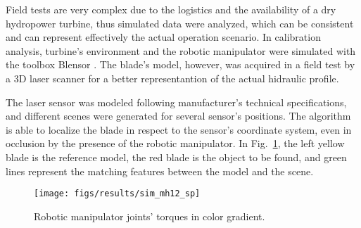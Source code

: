 Field tests are very complex due to the logistics and the availability of a dry
hydropower turbine, thus simulated data were analyzed, which can be consistent
and can represent effectively the actual operation scenario. In calibration
analysis, turbine's environment and the robotic manipulator were simulated with
the toolbox Blensor \cite{Gschwandtner11b}. The blade's model, however, was
acquired in a field test by a 3D laser scanner for a better representantion of
the actual hidraulic profile.

The laser sensor was modeled following manufacturer's technical
specifications, and different scenes were generated for several sensor's
positions. The algorithm is able to localize the blade in respect to the
sensor's coordinate system, even in occlusion by the presence of the robotic
manipulator. In Fig.~\ref{fig:calibration}, the left yellow blade is the
reference model, the red blade is the object to be found, and green lines
represent the matching features between the model and the scene.

\begin{figure}
	\centering
	\texttt{[image: figs/results/sim\_mh12\_sp]}
    \caption{Robotic manipulator joints' torques in color gradient.}
    \label{fig:calibration}
\end{figure}